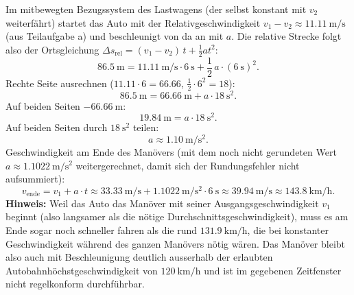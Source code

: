 \documentclass[addpoints,11pt,a4paper]{exam}
\begin{document}
\begin{questions}
\begin{taskbox}
\begin{parts}
\begin{solution}
  Im mitbewegten Bezugssystem des Lastwagens (der selbst konstant mit
  $v_2$ weiterfährt) startet das Auto mit der Relativgeschwindigkeit
  $v_1-v_2\approx\SI{11.11}{\meter\per\second}$ (aus Teilaufgabe a) und
  beschleunigt von da an mit $a$. Die relative Strecke folgt also der
  Ortsgleichung $\Delta s_{\text{rel}} = (v_1-v_2)\,t+\frac12 a t^2$:
  \[
    \SI{86.5}{\meter} = \SI{11.11}{\meter\per\second}\cdot\SI{6}{\second} + \frac12\,a\cdot(\SI{6}{\second})^2.
  \]
  Rechte Seite ausrechnen ($11.11\cdot6=66.66$, $\frac12\cdot6^2=18$):
  \[
    \SI{86.5}{\meter} = \SI{66.66}{\meter} + a\cdot\SI{18}{\second\squared}.
  \]
  Auf beiden Seiten $-\SI{66.66}{\meter}$:
  \[
    \SI{19.84}{\meter} = a\cdot\SI{18}{\second\squared}.
  \]
  Auf beiden Seiten durch $\SI{18}{\second\squared}$ teilen:
  \[
    a \approx \SI{1.10}{\meter\per\second\squared}.
  \]
  Geschwindigkeit am Ende des Manövers (mit dem noch nicht gerundeten Wert
  $a\approx\SI{1.1022}{\meter\per\second\squared}$ weitergerechnet, damit
  sich der Rundungsfehler nicht aufsummiert):
  \[
    v_{\text{ende}} = v_1 + a\cdot t \approx \SI{33.33}{\meter\per\second}
    + \SI{1.1022}{\meter\per\second\squared}\cdot\SI{6}{\second}
    \approx \SI{39.94}{\meter\per\second} \approx \SI{143.8}{\kilo\meter\per\hour}.
  \]
  \textbf{Hinweis:} Weil das Auto das Manöver mit seiner
  Ausgangsgeschwindigkeit $v_1$ beginnt (also langsamer als die nötige
  Durchschnittsgeschwindigkeit), muss es am Ende sogar noch schneller
  fahren als die rund $\SI{131.9}{\kilo\meter\per\hour}$, die bei
  konstanter Geschwindigkeit während des ganzen Manövers nötig wären. Das
  Manöver bleibt also auch mit Beschleunigung deutlich ausserhalb der
  erlaubten Autobahnhöchstgeschwindigkeit von $\SI{120}{\kilo\meter\per\hour}$
  und ist im gegebenen Zeitfenster nicht regelkonform durchführbar.
  \end{solution}
\end{parts}
\end{taskbox}
\end{questions}
\end{document}
